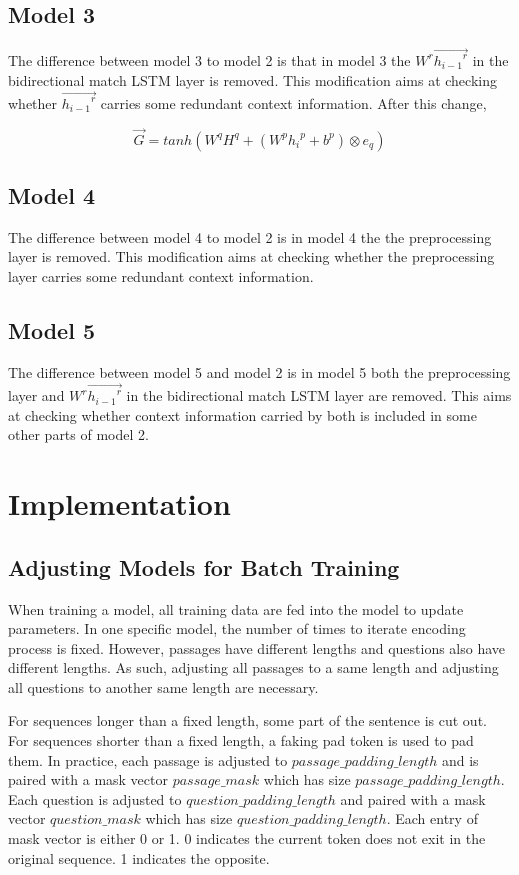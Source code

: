 \documentclass[modernstyle,12pt]{sjsuthesis}
\theoremstyle{definition}
\begin{document}
\section{Model 3}

The difference between model 3 to model 2 is that in model 3 the $W^r\overrightarrow{{h_{i-1}}^r}$ in the bidirectional match LSTM layer is removed. This modification aims at checking whether $\overrightarrow{{h_{i-1}}^r}$ carries some redundant context information. After this change,


$$\overrightarrow{G} = tanh(W^qH^q + (W^p{h_i}^p + b^p) \otimes e_q)$$


\section{Model 4}

The difference between model 4 to model 2 is in model 4 the the preprocessing layer is removed. This modification aims at checking whether the preprocessing layer carries some redundant context information.

\section{Model 5}

The difference between model 5 and model 2 is in model 5 both the preprocessing layer and $W^r\overrightarrow{{h_{i-1}}^r}$ in the bidirectional match LSTM layer are removed. This aims at checking whether context information carried by both is included in some other parts of model 2.

\chapter{Implementation}

\section{Adjusting Models for Batch Training}\label{sect:padding}

When training a model, all training data are fed into the model to update parameters. In one specific model, the number of times to iterate encoding process is fixed. However, passages have different lengths and questions also have different lengths. As such, adjusting all passages to a same length and adjusting all questions to another same length are necessary.

For sequences longer than a fixed length, some part of the sentence is cut out. For sequences shorter than a fixed length, a faking pad token is used to pad them. In practice, each passage is adjusted to $passage\_padding\_length$ and is paired with a mask vector $passage\_mask$ which has size $passage\_padding\_length$. Each question is adjusted to $question\_padding\_length$ and paired with a mask vector $question\_mask$ which has size $question\_padding\_length$. Each entry of mask vector is either 0 or 1. 0 indicates the current token does not exit in the original sequence. 1 indicates the opposite.
\end{document}
